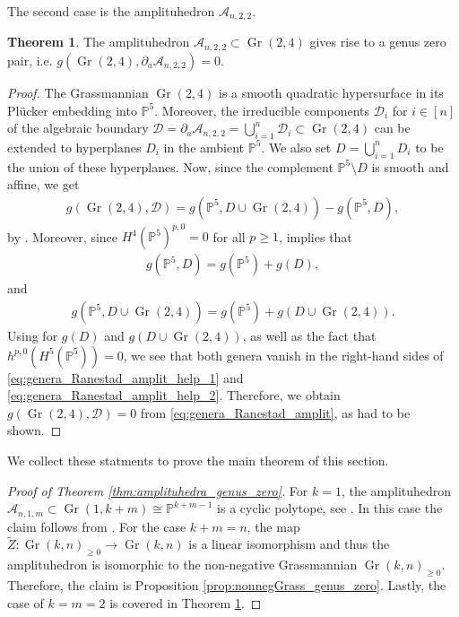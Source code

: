 \documentclass[12pt]{extarticle}
\theoremstyle{definition}
\theoremstyle{theorem}
\newtheorem{theorem}[definition]{Theorem}
\theoremstyle{remark}
\numberwithin{equation}{section}
\newcommand{\PP}{\mathbb{P}}
\DeclareMathOperator{\gr}{Gr}
\newcommand{\aA}{\mathcal{A}}
\begin{document}
The second case is the amplituhedron $\aA_{n,2,2}$.
\begin{theorem}\label{thm:m=2_k=2_has_genus_zero}
    The amplituhedron $\aA_{n,2,2}\subset \gr(2,4)$ gives rise to a genus zero pair, i.e. $g(\gr(2,4),\partial_a\aA_{n,2,2})=0$.
\end{theorem}
\begin{proof}
    The Grassmannian $\gr(2,4)$ is a smooth quadratic hypersurface in its Pl\"ucker embedding into $\PP^5$.
    Moreover, the irreducible components $\mathcal D_i$ for $i\in [n]$ of the algebraic boundary $\mathcal D=\partial_a\aA_{n,2,2}=\bigcup_{i=1}^n\mathcal D_i\subset \gr(2,4)$ can be extended to hyperplanes $D_i$ in the ambient $\PP^5$.
    We also set $D=\bigcup_{i=1}^nD_i$ to be the union of these hyperplanes.
    Now, since the complement $\PP^5\setminus D$ is smooth and affine, we get 
    \begin{align}\label{eq:genera_Ranestad_amplit}
    g(\gr(2,4), \mathcal{D}) = g(\PP^5,D\cup\gr(2,4))-g(\PP^5,D),
    \end{align}
    by \cite[Corollary 3.12]{brown-dupont}.
    Moreover, since $H^{4}(\PP^5)^{p,0}=0$ for all $p\geq 1$, \cite[Corollary 3.11]{brown-dupont} implies that
    \begin{align}\label{eq:genera_Ranestad_amplit_help_1}
    g(\PP^5,D)=g(\PP^5)+g(D),
    \end{align}
    and
    \begin{align}\label{eq:genera_Ranestad_amplit_help_2}
        g(\PP^5,D\cup\gr(2,4))=g(\PP^5)+g(D\cup\gr(2,4)).
    \end{align}
    Using \cite[Theorem 3.26]{brown-dupont} for $g(D)$ and $g(D\cup\gr(2,4))$, as well as the fact that $h^{p,0}(H^5(\PP^5))=0$, we see that both genera vanish in the right-hand sides of \eqref{eq:genera_Ranestad_amplit_help_1} and \eqref{eq:genera_Ranestad_amplit_help_2}.
    Therefore, we obtain $g(\gr(2,4), \mathcal D)=0$ from \eqref{eq:genera_Ranestad_amplit}, as had to be shown.
\end{proof}

We collect these statments to prove the main theorem of this section.
\begin{proof}[Proof of Theorem \ref{thm:amplituhedra_genus_zero}]
    For $k=1$, the amplituhedron $\aA_{n,1,m}\subset \gr(1,k+m)\cong \PP^{k+m-1}$ is a cyclic polytope, see \cite[Theorem 1]{lam2024invitation}. In this case the claim follows from \cite[Section 6]{brown-dupont}.
    For the case $k+m=n$, the map $\tilde{Z}:\gr(k,n)_{\geq 0}\rightarrow \gr(k,n)$ is a linear isomorphism and thus the amplituhedron is isomorphic to the non-negative Grassmannian $\gr(k,n)_{\geq 0}$.
    Therefore, the claim is Proposition \ref{prop:nonnegGrass_genus_zero}.
    Lastly, the case of $k=m=2$ is covered in Theorem \ref{thm:m=2_k=2_has_genus_zero}.
\end{proof}
\end{document}
